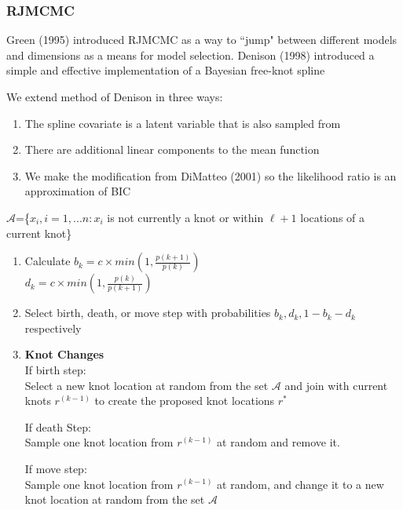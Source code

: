 \documentclass[handout]{beamer}\usepackage[]{graphicx}\usepackage[]{color}
\begin{document}
\begin{frame}
\frametitle{RJMCMC}
Green (1995) introduced RJMCMC as a way to ``jump" between different models and dimensions as a means for model selection. Denison (1998) introduced a simple and effective implementation of a Bayesian free-knot spline

\vspace{0.5cm}

We extend method of Denison  in three ways:
\begin{enumerate}
\item
The spline covariate is a latent variable that is also sampled from
\item
There are additional linear components to the mean function
\item
We make the modification from DiMatteo (2001) so the likelihood ratio is an approximation of BIC
\end{enumerate}


\end{frame}

\begin{frame}
$\mathcal{A}$=\{$x_i,i=1,...n:x_i$ is not currently a knot or within $\ell+1$ locations of a current knot\}


\begin{enumerate}
\item
Calculate $b_k = c \times min\left(1, \frac{p(k+1)}{p(k)} \right)$ \\
$d_k = c \times min\left(1, \frac{p(k)}{p(k+1)} \right)$ 

\item
Select birth, death, or move step with probabilities $b_k,d_k,1-b_k-d_k$ respectively \\

\item
{\bf Knot Changes} \\
If birth step:\\
Select a new knot location at random from the set $\mathcal{A}$ and join with current knots $r_{}^{(k-1)}$ to create the proposed knot locations $r_{}^{*}$

If death Step:\\
Sample one knot location from $r_{}^{(k-1)}$ at random and remove it. 

If move step:\\
Sample one knot location from $r_{}^{(k-1)}$ at random, and change it to a new knot location at random from the set $\mathcal{A}$

\end{enumerate}
\end{frame}
\end{document}
